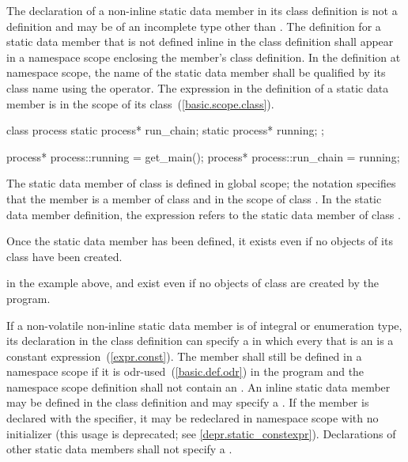 \pnum
{}%
%
The declaration of a non-inline
static data member in its class definition
is not a definition and may be of an incomplete type other than
\cv{} . The definition for a static data
member that is not defined inline in the class definition
shall appear in a namespace scope enclosing the member's class
definition.
%
In the definition at namespace scope, the name of the static
data member shall be qualified by its class name using the \tcode{::}
operator. The  expression in the definition of a
static data member is in the scope of its
class~(\ref{basic.scope.class}).
%
\begin{example}

\begin{codeblock}
class process {
  static process* run_chain;
  static process* running;
};

process* process::running = get_main();
process* process::run_chain = running;
\end{codeblock}

The static data member  of class
 is defined in global scope; the notation
 specifies that the member 
is a member of class  and in the scope of class
. In the static data member definition, the
 expression refers to the static data
member  of class .
\end{example}

\begin{note}
Once the static data member has been defined, it exists even if
no objects of its class have been created.
\begin{example}
in the example above,  and  exist even
if no objects of class  are created by the program.
\end{example}
\end{note}

\pnum
If a non-volatile non-inline  static data member is
of integral or enumeration type,
its declaration in the class definition can specify a
 in which every
 that is an 
is a constant expression~(\ref{expr.const}).
The member shall still be defined in a namespace scope if
it is odr-used~(\ref{basic.def.odr}) in the program and the
namespace scope definition shall not contain an .
An inline static data member may be defined in the class definition
and may specify a . If the
member is declared with the  specifier, it may be
redeclared in namespace scope with no initializer (this usage is
deprecated; see \ref{depr.static_constexpr}). Declarations of other
static data members shall not specify a .

